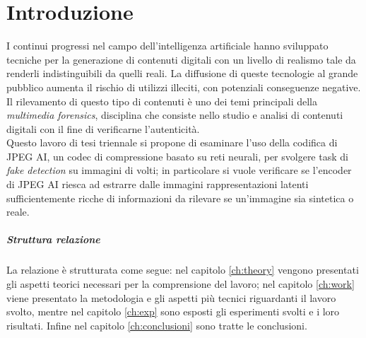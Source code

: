 \chapter*{Introduzione}\label{ch:intro}
I continui progressi nel campo dell'intelligenza artificiale hanno sviluppato tecniche per la generazione di contenuti digitali con un livello di realismo tale da renderli indistinguibili da quelli reali. La diffusione di queste tecnologie al grande pubblico aumenta il rischio di utilizzi illeciti, con potenziali conseguenze negative. Il rilevamento di questo tipo di contenuti è uno dei temi principali della \textit{multimedia forensics}, disciplina che consiste nello studio e analisi di contenuti digitali con il fine di verificarne l'autenticità.\\
Questo lavoro di tesi triennale si propone di esaminare l'uso della codifica di JPEG AI, un codec di compressione basato su reti neurali, per svolgere task di \textit{fake detection} su immagini di volti; in particolare si vuole verificare se l'encoder di JPEG AI riesca ad estrarre dalle immagini rappresentazioni latenti sufficientemente ricche di informazioni da rilevare se un'immagine sia sintetica o reale.
\paragraph{Struttura relazione}
La relazione è strutturata come segue: nel capitolo \ref{ch:theory} vengono presentati gli aspetti teorici necessari per la comprensione del lavoro; nel capitolo \ref{ch:work} viene presentato la metodologia e gli aspetti più tecnici riguardanti il lavoro svolto, mentre nel capitolo \ref{ch:exp} sono esposti gli esperimenti svolti e i loro risultati. Infine nel capitolo \ref{ch:conclusioni} sono tratte le conclusioni.

